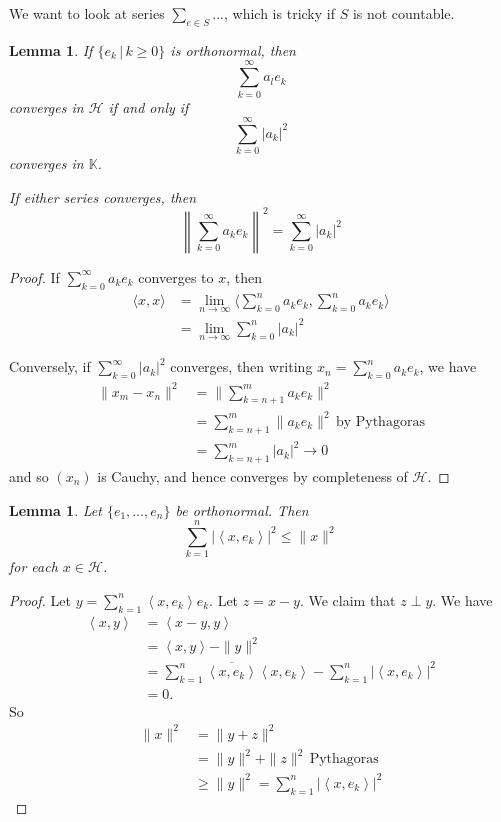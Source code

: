 \documentclass[justified]{tufte-book}
\theoremstyle{plain}%
\newtheorem{lem}[thm]{Lemma}
\theoremstyle{definition}
\theoremstyle{remark}
\newcommand{\K}{\mathbb{K}}
\renewcommand{\H}{\mathcal{H}}
\newcommand{\iprod}[1]{\left\langle #1 \right\rangle}
\newcommand{\sumkn}{\sum_{k=1}^n}
\begin{document}
  We want to look at series $\sum_{e \in S} ...$, which is tricky if $S$ is not countable.

\begin{lem}\label{lem:tod}
  If $\{ e_k \, | \, k \geq 0 \}$ is orthonormal, then \[
      \sum_{k=0}^\infty a_l e_k
  \] converges in $\H$ if and only if \[
      \sum_{k=0}^\infty |a_k |^2
  \] converges in $\K$.  
  
  If either series converges, then \[
      \left\| \sum_{k=0}^\infty a_k e_k \right\|^2 = \sum_{k=0}^\infty | a_k |^2
  \]
\end{lem}



\begin{proof}
  If $\sum_{k=0}^\infty a_k e_k$ converges to $x$, then
     \begin{align*}
      \langle x, x \rangle &= \lim_{n \rightarrow \infty} \langle \sum_{k=0}^n a_k e_k, \sum_{k=0}^n a_k e_k \rangle \\
      &= \lim_{n \rightarrow \infty} \sum_{k=0}^n | a_k |^2
  \end{align*}
  
  Conversely, if $\sum_{k=0}^\infty |a_k |^2$ converges, then writing $x_n = \sum_{k=0}^n a_k e_k$, we have \begin{align*}
      \| x_m - x_n \|^2 &= \| \sum_{k=n+1}^m a_k e_k \|^2 \\
                      &= \sum_{k=n+1}^m \| a_k e_k \|^2 \, \text{by Pythagoras} \\
                      &= \sum_{k=n+1}^m |a_k |^2 \rightarrow 0
  \end{align*} and so $(x_n)$ is Cauchy, and hence converges by completeness of $\H$.  
\end{proof}

\begin{lem}
  Let $\{ e_1, \dots, e_n \}$ be orthonormal. Then \[
      \sumkn | \iprod{x, e_k} |^2 \leq \|x\|^2 
  \] for each $x \in \H$.  
\end{lem}
\begin{proof}
  Let $y = \sumkn \iprod{x, e_k} e_k$.  Let $z = x-y$.  We claim that $z \perp y$.  We have 
  \begin{align*}
      \iprod{x,y} &= \iprod{x-y, y} \\
                  &= \iprod{x,y} - \| y \|^2 \\
                  &= \sumkn \overline{\iprod{x,e_k}} \iprod{x, e_k} - \sumkn | \iprod {x, e_k} |^2 \\
                  &= 0.
  \end{align*}
  So \begin{align*}
      \| x \|^2   &= \|y + z \|^2 \\
                  &= \| y \|^2 + \| z \|^2 \, \text{Pythagoras} \\
                  &\geq \|y \|^2 = \sumkn | \iprod{x, e_k} |^2
  \end{align*} 
\end{proof}
\end{document}
